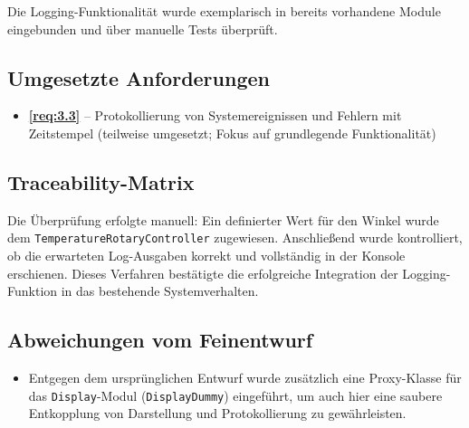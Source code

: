 \documentclass[a4paper,12pt]{article}
\begin{document}
Die Logging-Funktionalität wurde exemplarisch in bereits vorhandene Module eingebunden und über manuelle Tests überprüft.

\subsection{Umgesetzte Anforderungen}

\begin{itemize}
    \item \textbf{\ref{req:3.3}} – Protokollierung von Systemereignissen und Fehlern mit Zeitstempel (teilweise umgesetzt; Fokus auf grundlegende Funktionalität)
\end{itemize}

\subsection{Traceability-Matrix}


\vspace{1em}
Die Überprüfung erfolgte manuell: Ein definierter Wert für den Winkel wurde dem \texttt{TemperatureRotaryController} zugewiesen. Anschließend wurde kontrolliert, ob die erwarteten Log-Ausgaben korrekt und vollständig in der Konsole erschienen. Dieses Verfahren bestätigte die erfolgreiche Integration der Logging-Funktion in das bestehende Systemverhalten.

\subsection{Abweichungen vom Feinentwurf}

\begin{itemize}
    \item Entgegen dem ursprünglichen Entwurf wurde zusätzlich eine Proxy-Klasse für das \texttt{Display}-Modul (\texttt{DisplayDummy}) eingeführt, um auch hier eine saubere Entkopplung von Darstellung und Protokollierung zu gewährleisten.
\end{itemize}
\end{document}
